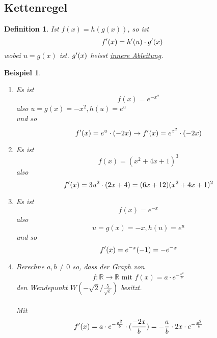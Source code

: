 \documentclass{report}
\newtheorem{mydef}{Definition}
\newtheorem{myexample}{Beispiel}
\begin{document}
\subsection{Kettenregel}
\begin{mydef}
Ist $f(x) = h(g(x))$, so ist
\begin{equation}
f\rq{}(x) = h\rq{}(u) \cdot g\rq{}(x)
\end{equation}
wobei $u = g(x)$ ist. $g\rq{}(x)$ heisst \underline{innere Ableitung}.
\end{mydef}
\begin{myexample}
\begin{enumerate}
\item Es ist\\
\begin{equation}
f(x) = e^{-x^2}
\end{equation}
also $u = g(x) = -x^2, h(u) = e^u$\\
und so
\begin{equation}
f\rq{}(x) = e^u \cdot (-2x) \to f\rq{}(x) = e^{x^2} \cdot (-2x)
\end{equation}
\item
Es ist
\begin{equation}
f(x) = (x^2 + 4x + 1)^3
\end{equation}
also
\begin{equation}
f\rq{}(x) = 3u^2 \cdot (2x + 4) = (6x+12)(x^2+4x+1)^2
\end{equation}
\item
Es ist
\begin{equation}
f(x) = e^{-x}
\end{equation}
also
\begin{equation}
u = g(x) = -x, h(u) = e^u
\end{equation}
und so
\begin{equation}
f\rq{}(x) = e^{-x} (-1) = -e^{-x}
\end{equation}
\item
Berechne $a,b \neq 0$ so, dass der Graph von
\begin{equation}
f: \mathbb{R} \longrightarrow \mathbb{R} \mbox{ mit } f(x) = a \cdot e^{- \frac{x^2}{b}}
\end{equation}
den Wendepunkt $W(-\sqrt{2} / \frac{5}{\sqrt{e}})$ besitzt.\\\\
Mit
\begin{equation}
f\rq{}(x) = a \cdot e^{- \frac{x^2}{b}} \cdot ( \frac{-2x}{b} ) = -\frac{a}{b} \cdot 2x \cdot e^{- \frac{x^2}{b}}
\end{equation}

\end{enumerate}
\end{myexample}
\end{document}
